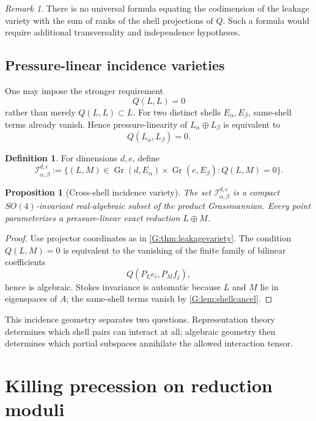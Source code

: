 \documentclass[
 aps,
 prd,
 reprint,
 amsmath,
 amssymb,
 nofootinbib,
 superscriptaddress
]{revtex4-2}
\newtheorem{proposition}[theorem]{Proposition}
\theoremstyle{definition}
\newtheorem{definition}[theorem]{Definition}
\theoremstyle{remark}
\newtheorem{remark}[theorem]{Remark}
\newcommand{\Gr}{\operatorname{Gr}}
\begin{document}
\begin{remark}
There is no universal formula equating the codimension of the leakage variety
with the sum of ranks of the shell projections of \(Q\).  Such a formula
would require additional transversality and independence hypotheses.
\end{remark}

\subsection{Pressure-linear incidence varieties}

One may impose the stronger requirement
\[
          Q(L,L)=0
\]
rather than merely $Q(L,L)\subset L$.  For two distinct shells
$E_\alpha,E_\beta$, same-shell terms already vanish.  Hence pressure-linearity
of $L_\alpha\oplus L_\beta$ is equivalent to
\[
          Q(L_\alpha,L_\beta)=0.
\]

\begin{definition}
For dimensions $d,e$, define
\begin{equation}
 \mathcal I_{\alpha,\beta}^{d,e}
 :=
 \{(L,M)\in
 \Gr(d,E_\alpha)\times\Gr(e,E_\beta):
 Q(L,M)=0\}.
 \label{G:eq:incidence}
\end{equation}
\end{definition}

\begin{proposition}[Cross-shell incidence variety]
\label{G:prop:incidence}
The set $\mathcal I_{\alpha,\beta}^{d,e}$ is a compact
$SO(4)$-invariant real-algebraic subset of the product Grassmannian.
Every point parameterizes a pressure-linear exact reduction
$L\oplus M$.
\end{proposition}

\begin{proof}
Use projector coordinates as in \cref{G:thm:leakagevariety}.  The condition
$Q(L,M)=0$ is equivalent to the vanishing of the finite family of bilinear
coefficients
\[
      Q(P_Le_i,P_Mf_j),
\]
hence is algebraic.  Stokes invariance is automatic because $L$ and $M$ lie
in eigenspaces of $A$; the same-shell terms vanish by
\cref{G:lem:shellcancel}.
\end{proof}

This incidence geometry separates two questions.  Representation theory
determines which shell pairs can interact at all; algebraic geometry then
determines which partial subspaces annihilate the allowed interaction tensor.


\section{Killing precession on reduction moduli}
\end{document}
